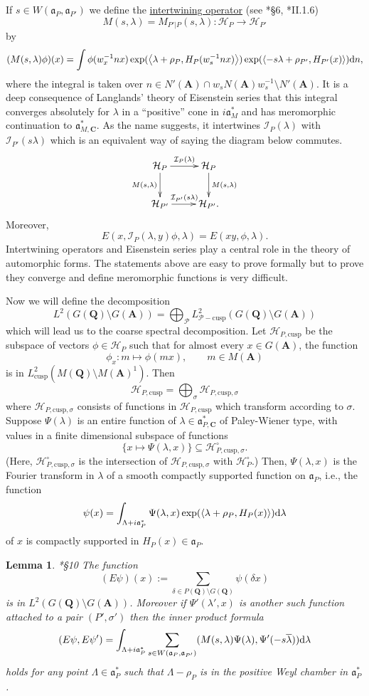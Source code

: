 \documentclass[11pt]{amsart}
\def\A{\mathbf A}
\def\C{\mathbf C}
\def\Q{\mathbf Q}
\def\HHH{\mathcal H}
\def\III{\mathcal I}
\def\PPP{\mathcal P}
\def\aaa{\mathfrak a}
\def\d{\text d}
\def\bs{\setminus}
\def\cusp{\text{cusp}}
\def\Ltwo{L^2}
\def\sprod#1#2{\left\langle #1 , #2 \right\rangle}  %
\newtheorem{lemma}[theorem]{Lemma}
\theoremstyle{remark}
\begin{document}
If $s \in W(\aaa_P, \aaa_{P'})$ we define the \underline{intertwining operator} (see \cite{MR2683009}*{\S 6}, \cite{MW}*{II.1.6})
\[ M(s, \lambda) = M_{P'|P}(s, \lambda) : \HHH_P \to \HHH_{P'} \]
by
\[ (M(s, \lambda)\phi)(x) = \int \phi(w_x^{-1}n x) \exp(\sprod{\lambda + \rho_P}{H_P(w_s^{-1}n x)})
				 \exp(\sprod{- s\lambda + \rho_{P'}}{H_{P'}(x)}) \d n, \]
where the integral is taken over $n \in N'(\A) \cap w_s N(\A)w_s^{-1} \bs N'(\A)$. It is a deep consequence of Langlands' theory of Eisenstein series that this integral converges absolutely for $\lambda$ in a ``positive'' cone in $i\aaa_M^*$ and has meromorphic continuation to $\aaa_{M, \C}^*$. As the name suggests, it intertwines $\III_P(\lambda)$ with $\III_{P'}(s\lambda)$ which is an equivalent way of saying the diagram below commutes. 
\[ \xymatrix{
	\HHH_P \ar[r]^{\III_P(\lambda)} \ar[d]_{M(s, \lambda)} & \HHH_P \ar[d]^{M(s, \lambda)} \\
	\HHH_{P'} \ar[r]^{\III_{P'}(s\lambda)} & \HHH_{P'}.
 } \]
Moreover,
\[ E(x, \III_P(\lambda, y)\phi, \lambda) = E(xy, \phi, \lambda). \]
Intertwining operators and Eisenstein series play a central role in the theory of automorphic forms. The statements above are easy to prove formally but to prove they converge and define meromorphic functions is very difficult.

Now we will define the decomposition
\[ \Ltwo(G(\Q)\bs G(\A)) = \bigoplus_\PPP \Ltwo_{\PPP-\cusp}(G(\Q)\bs G(\A)) \]
which will lead us to the coarse spectral decomposition. Let $\HHH_{P, \cusp}$ be the subspace of vectors $\phi \in \HHH_P$ such that for almost every $x \in G(\A)$, the function
\[ \phi_x : m \mapsto \phi(mx) , \qquad m \in M(\A) \]
is in $\Ltwo_{\cusp}(M(\Q)\bs M(\A)^1)$. Then
\[ \HHH_{P, \cusp} = \bigoplus_\sigma \HHH_{P, \cusp, \sigma} \]
where $\HHH_{P, \cusp, \sigma}$ consists of functions in $\HHH_{P, \cusp}$ which transform according to $\sigma$. Suppose $\Psi(\lambda)$ is an entire function of $\lambda \in \aaa_{P, \C}^*$ of Paley-Wiener type, with values in a finite dimensional subspace of functions
\[ \{ x \mapsto \Psi(\lambda, x) \} \subseteq \HHH_{P, \cusp, \sigma}^\circ. \]
(Here, $\HHH_{P, \cusp, \sigma}^\circ$ is the intersection of $\HHH_{P, \cusp, \sigma}$ with $\HHH_P^\circ$.) Then, $\Psi(\lambda, x)$ is the Fourier transform in $\lambda$ of a smooth compactly supported function on $\aaa_P$, i.e., the function
\[ \psi(x) = \int_{\Lambda + i\aaa_P^*} \Psi(\lambda, x) \exp(\sprod{\lambda + \rho_P}{H_P(x)}) \d \lambda \]
of $x$ is compactly supported in $H_P(x) \in \aaa_P$. 
\begin{lemma} \cite{MR0249539}*{\S 10}
	The function 
	\[ (E\psi)(x) := \sum_{\delta \in P(\Q)\bs G(\Q)} \psi(\delta x) \]
	is in $\Ltwo(G(\Q)\bs G(\A))$. Moreover if $\Psi'(\lambda', x)$ is another such function attached to a pair $(P', \sigma')$ then the inner product formula
	\[ (E\psi, E\psi') = \int_{\Lambda + i\aaa_P^*} \sum_{s \in W(\aaa_P, \aaa_{P'})}
				(M(s, \lambda)\Psi(\lambda), \Psi'(-s\overline \lambda)) \d \lambda \]
	holds for any point $\Lambda \in \aaa_P^*$ such that $\Lambda - \rho_P$ is in the positive Weyl chamber in $\aaa_P^*$. 
\end{lemma}
\end{document}
